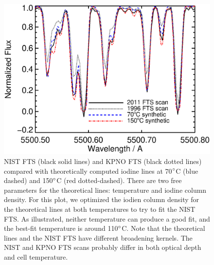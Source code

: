 \begin{figure}
\centering
\includegraphics[scale=0.5]{het/HET_NIST_temp.eps}
\caption{NIST FTS (black solid lines) and KPNO FTS (black dotted
  lines) compared with theoretically computed iodine lines at
  70$^{\circ}$C (blue dashed) and 150$^{\circ}$C (red
  dotted-dashed). There are two free parameters for the theoretical
  lines: temperature and iodine column density. For this plot, we optimized
  the iodien column density for the theoretical lines at both
  temperatures to try to fit the NIST FTS. As illustrated, neither
  temperature can produce a good fit, and the best-fit temperature is
  around 110$^{\circ}$C. Note that the theoretical lines and the NIST
  FTS have different broadening kernels. The NIST and KPNO FTS scans
  probably differ in both optical depth and cell temperature.
\label{het:fig:iodspec5}}
\end{figure}


